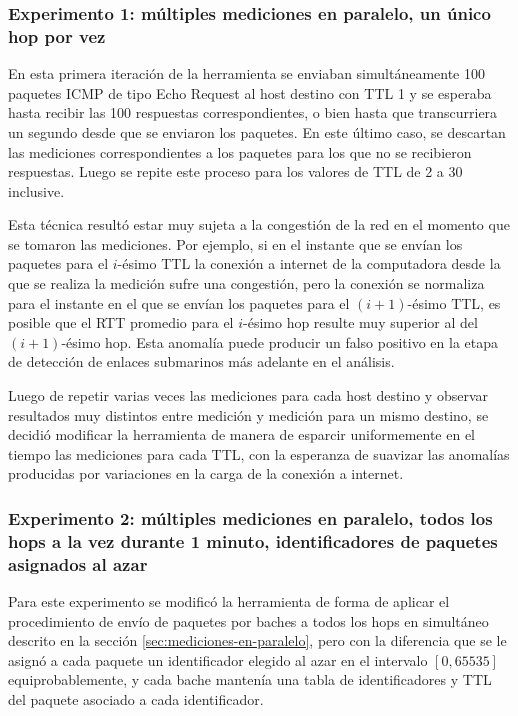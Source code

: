 \documentclass[a4paper, 10pt, twoside]{article}
\begin{document}
\subsubsection{Experimento 1: múltiples mediciones en paralelo, un único hop por vez}

En esta primera iteración de la herramienta se enviaban simultáneamente 100 paquetes ICMP de tipo Echo Request al host destino con TTL 1 y se esperaba hasta recibir las 100 respuestas correspondientes, o bien hasta que transcurriera un segundo desde que se enviaron los paquetes. En este último caso, se descartan las mediciones correspondientes a los paquetes para los que no se recibieron respuestas. Luego se repite este proceso para los valores de TTL de 2 a 30 inclusive.

Esta técnica resultó estar muy sujeta a la congestión de la red en el momento que se tomaron las mediciones. Por ejemplo, si en el instante que se envían los paquetes para el $i$-ésimo TTL la conexión a internet de la computadora desde la que se realiza la medición sufre una congestión, pero la conexión se normaliza para el instante en el que se envían los paquetes para el $(i+1)$-ésimo TTL, es posible que el RTT promedio para el $i$-ésimo hop resulte muy superior al del $(i+1)$-ésimo hop. Esta anomalía puede producir un falso positivo en la etapa de detección de enlaces submarinos más adelante en el análisis.

Luego de repetir varias veces las mediciones para cada host destino y observar resultados muy distintos entre medición y medición para un mismo destino, se decidió modificar la herramienta de manera de esparcir uniformemente en el tiempo las mediciones para cada TTL, con la esperanza de suavizar las anomalías producidas por variaciones en la carga de la conexión a internet.


\subsubsection{Experimento 2: múltiples mediciones en paralelo, todos los hops a la vez durante 1 minuto, identificadores de paquetes asignados al azar}

Para este experimento se modificó la herramienta de forma de aplicar el procedimiento de envío de paquetes por baches a todos los hops en simultáneo descrito en la sección \ref{sec:mediciones-en-paralelo}, pero con la diferencia que se le asignó a cada paquete un identificador elegido al azar en el intervalo $[0, 65535]$ equiprobablemente, y cada bache mantenía una tabla de identificadores y TTL del paquete asociado a cada identificador.
\end{document}
